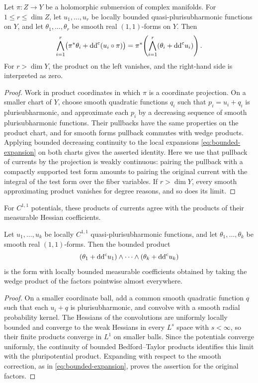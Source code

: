 \begin{lemma}\label{lem:bounded-products-submersion}
Let $\pi\colon Z\to Y$ be a holomorphic submersion of complex manifolds. For $1\leq r\leq\dim Z$, let $u_1,\ldots,u_r$ be locally bounded quasi-plurisubharmonic functions on $Y$, and let $\theta_1,\ldots,\theta_r$ be smooth real $(1,1)$-forms on $Y$. Then
\[
 \bigwedge_{i=1}^r\bigl(\pi^*\theta_i+\mathrm{dd}^{\mathrm{c}}(u_i\circ\pi)\bigr)
 =\pi^*\!\left(\bigwedge_{i=1}^r(\theta_i+\mathrm{dd}^{\mathrm{c}} u_i)\right).
\]
For $r>\dim Y$, the product on the left vanishes, and the right-hand side is interpreted as zero.
\end{lemma}
\begin{proof}
Work in product coordinates in which $\pi$ is a coordinate projection. On a smaller chart of $Y$, choose smooth quadratic functions $q_i$ such that $p_i=u_i+q_i$ is plurisubharmonic, and approximate each $p_i$ by a decreasing sequence of smooth plurisubharmonic functions. Their pullbacks have the same properties on the product chart, and for smooth forms pullback commutes with wedge products. Applying bounded decreasing continuity to the local expansions \eqref{eq:bounded-expansion} on both charts gives the asserted identity. Here we use that pullback of currents by the projection is weakly continuous: pairing the pullback with a compactly supported test form amounts to pairing the original current with the integral of the test form over the fiber variables. If $r>\dim Y$, every smooth approximating product vanishes for degree reasons, and so does its limit.
\end{proof}

For $C^{1,1}$ potentials, these products of currents agree with the products of their measurable Hessian coefficients.

\begin{proposition}\label{prop:c11-products}
Let $u_1,\ldots,u_k$ be locally $C^{1,1}$ quasi-plurisubharmonic functions, and let $\theta_1,\ldots,\theta_k$ be smooth real $(1,1)$-forms. Then the bounded product
\[
 (\theta_1+\mathrm{dd}^{\mathrm{c}} u_1)\wedge\cdots\wedge(\theta_k+\mathrm{dd}^{\mathrm{c}} u_k)
\]
is the form with locally bounded measurable coefficients obtained by taking the wedge product of the factors pointwise almost everywhere.
\end{proposition}
\begin{proof}
On a smaller coordinate ball, add a common smooth quadratic function $q$ such that each $u_i+q$ is plurisubharmonic, and convolve with a smooth radial probability kernel. The Hessians of the convolutions are uniformly locally bounded and converge to the weak Hessians in every $L^s$ space with $s<\infty$, so their finite products converge in $L^1$ on smaller balls. Since the potentials converge uniformly, the continuity of bounded Bedford--Taylor products identifies this limit with the pluripotential product. Expanding with respect to the smooth correction, as in \eqref{eq:bounded-expansion}, proves the assertion for the original factors.
\end{proof}

